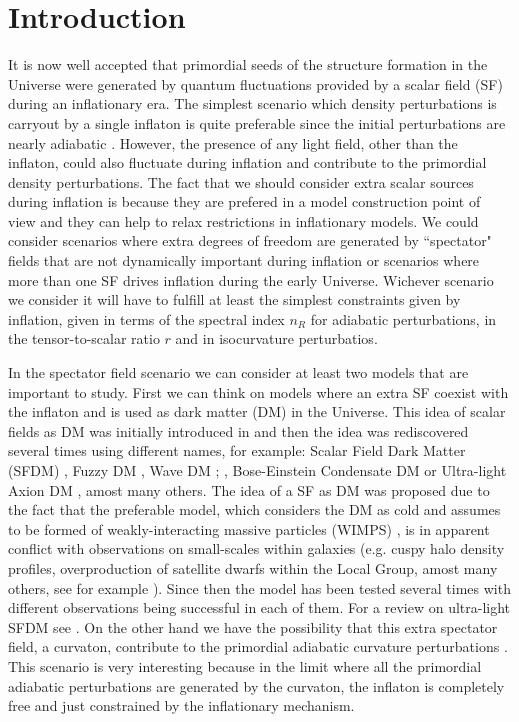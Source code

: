 \documentclass[amssymb,twocolumn,prd,nofootinbib,showpacs]{revtex4-1}
\begin{document}
\section{Introduction}
\label{introduction}
It is now well accepted that primordial seeds of the structure formation in the Universe were generated by quantum fluctuations provided by a scalar field (SF) during an inflationary era. The simplest scenario which density perturbations is carryout by a single inflaton is quite preferable since the initial perturbations are nearly adiabatic \cite{const1,const2,planck}. However, the presence of any light field, other than the inflaton, could also fluctuate during inflation and contribute to the primordial density perturbations. The fact that we should consider extra scalar sources during inflation is because they are prefered in a model construction point of view and they can help to relax restrictions in inflationary models. We could consider scenarios where extra degrees of freedom are generated by ``spectator" fields that are not dynamically important during inflation or scenarios where more than one SF drives inflation during the early Universe. Wichever scenario we consider it will have to fulfill at least the simplest constraints given by inflation, given in terms of the spectral index $n_R$ for adiabatic perturbations, in the tensor-to-scalar ratio $r$ and in isocurvature perturbatios. 

In the spectator field scenario we can consider at least two models that are important to study. First we can think on models where an extra SF coexist with the inflaton and is used as dark matter (DM) in the Universe. This idea of scalar fields as DM was initially introduced in \cite{SF1} and then the idea was rediscovered several times using different names, for example: Scalar Field Dark Matter  (SFDM)  \cite{SF2},  Fuzzy  DM  \cite{SF3}, Wave DM \cite{SF4}; \cite{SF5}, Bose-Einstein
Condensate DM \cite{SF6} or Ultra-light Axion DM
\cite{SF7,SF8}, amost many others. The idea of a SF as DM was proposed due to the fact that the preferable model, which considers the DM as cold and assumes to be formed of weakly-interacting massive particles (WIMPS) \cite{LCDM1,LCDM2}, is in apparent conflict with observations on small-scales within galaxies (e.g. cuspy halo density profiles, overproduction of satellite dwarfs within the Local Group, amost many others, see for example \cite{problem1,problem2,problem3,problem4,problem5}). Since then the model has been tested several times with different observations being successful in each of them. For a review on ultra-light SFDM see \cite{SF9,SF10,SF11,SF12}. On the other hand we have the possibility that this extra spectator field, a curvaton, contribute to the primordial adiabatic curvature perturbations \cite{curv1,curv2,curv3}. This scenario is very interesting because in the limit where all the primordial adiabatic perturbations are generated by the curvaton, the inflaton is completely free and just constrained by the inflationary mechanism.
\end{document}
